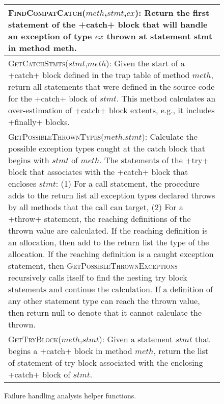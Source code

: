 \begin{figure}[t]
\scriptsize
\renewcommand*{\arraystretch}{1.3}
\begin{tabular}{|p{3.3in}|}
\hline 

\textsc{FindCompatCatch}($meth$,$stmt$,$ex$): Return the first
  statement of the +catch+ block that will handle an
  exception of type $ex$ thrown at statement stmt in method meth.
\\
\hline
\textsc{GetCatchStmts}($stmt$,$meth$): Given the start of a
+catch+ block defined in the trap table of method $meth$,
return all statements that were defined in the source code for the
+catch+ block of $stmt$.  This method calculates an
over-estimation of +catch+ block extents, e.g., it includes
+finally+ blocks.
\\
\hline
\textsc{GetPossibleThrownTypes}($meth$,$stmt$): Calculate the
possible exception types caught at the catch block that begins with
$stmt$ of $meth$. The statements of the +try+ block that associates with the +catch+ block
that encloses $stmt$:  (1) For a call statement, the
procedure adds to the return list all exception types declared throws
by all methods that the call can target,  (2) For a +throw+
statement, the reaching definitions of the thrown value are
calculated.  If the reaching definition is an allocation, then add to
the return list the type of the allocation.  If the reaching
definition is a caught exception statement, then
\textsc{GetPossibleThrownExceptions} recursively calls itself to find
the nesting try block statements and continue the calculation.  If a
definition of any other statement type can reach the thrown value,
then return null to denote that it cannot calculate the
thrown.  
\\
\hline
\textsc{GetTryBlock}($meth$,$stmt$): Given a statement $stmt$
  that begins a +catch+ block in method $meth$, return the
  list of statement of try block associated with the enclosing
  +catch+ block of $stmt$.
\\
\hline
\end{tabular}
\caption{\label{fig:helper-funs}Failure handling analysis helper functions.}
\vspace{-0.1in}
\end{figure}

